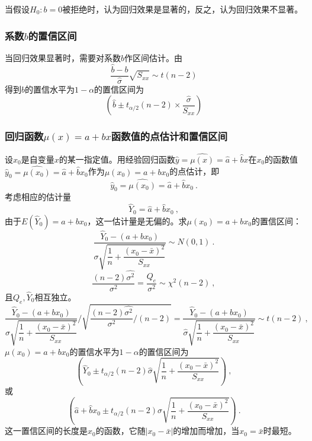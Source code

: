 \documentclass[12pt,a4paper]{article}
\begin{document}
当假设$H_0 : b = 0$被拒绝时，认为回归效果是显著的，反之，认为回归效果不显著。


\subsubsection{系数$b$的置信区间}
当回归效果显著时，需要对系数$b$作区间估计。由
\begin{equation*}
\frac{\hat{b} -b}{\hat{\sigma} } \sqrt{S_{xx}} \sim  t(n-2) 
\end{equation*}
得到$b$的置信水平为$1-\alpha$的置信区间为
\begin{equation}
\left(\hat{b} \pm t_{\alpha/2}(n-2) \times \frac{\hat{\sigma}}{S_{xx}} \right)
\end{equation}


\subsubsection{回归函数$\mu(x) = a+bx$函数值的点估计和置信区间}
设$x_0$是自变量$x$的某一指定值。用经验回归函数$\hat{y} = \widehat{\mu(x)} = \hat{a}+\hat{b}x$在$x_0$的函数值$\hat{y}_0 = \widehat{\mu(x_0)} = \hat{a}+\hat{b}x_0$作为$\mu(x_0) = a+bx_0$的点估计，即
\begin{equation}
\hat{y}_0 = \widehat{\mu(x_0)} = \hat{a}+\hat{b}x_0 ~.
\end{equation}
考虑相应的估计量
\begin{equation}
\hat{Y}_0 = \hat{a}+\hat{b}x_0 ~,
\end{equation}
由于$E(\hat{Y}_0) = a+b x_0$，这一估计量是无偏的。求$\mu(x_0) = a +bx_0$的置信区间：
\begin{equation*}
\frac{\hat{Y}_0 - (a+bx_0)}{\sigma \sqrt{\dfrac{1}{n} +\dfrac{(x_0 -\bar{x})^2}{S_{xx}} } } \sim N(0, 1) ~.
\end{equation*}
\begin{equation}
\frac{(n-2) \widehat{\sigma^2}}{\sigma^2} = \frac{Q_e}{\sigma^2} \sim \chi^2 (n-2) ~,
\end{equation}
且$Q_e, \hat{Y}_0$相互独立。
\begin{equation*}
\frac{\hat{Y}_0 - (a+bx_0)}{\sigma \sqrt{\dfrac{1}{n} +\dfrac{(x_0 -\bar{x})^2}{S_{xx}} } }\Bigg/ \sqrt{\dfrac{(n-2)\widehat{\sigma^2} }{\sigma^2} \bigg/ (n-2)} =  \frac{\hat{Y}_0 - (a+bx_0)}{\hat{\sigma} \sqrt{\dfrac{1}{n} +\dfrac{(x_0 -\bar{x})^2}{S_{xx}} } } \sim t(n-2) ~,
\end{equation*}
$\mu(x_0) = a +bx_0$的置信水平为$1-\alpha$的置信区间为
\begin{equation}
\left( \hat{Y}_0 \pm t_{\alpha/2}(n-2) \hat{\sigma} \sqrt{\dfrac{1}{n} +\dfrac{(x_0 -\bar{x})^2}{S_{xx}} }  \right) ~,
\end{equation}
或
\begin{equation}
\left( \hat{a} +\hat{b}x_0 \pm t_{\alpha/2}(n-2) \hat{\sigma} \sqrt{\dfrac{1}{n} +\dfrac{(x_0 -\bar{x})^2}{S_{xx}} }  \right) ~.
\end{equation}
这一置信区间的长度是$x_0$的函数，它随$|x_0 -\bar{x}|$的增加而增加，当$x_0 = \bar{x}$时最短。
\end{document}
